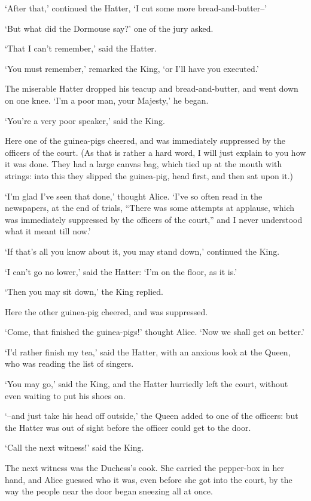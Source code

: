 \documentclass[statementpaper,twoside,openany]{memoir}
\begin{document}
`After that,' continued the Hatter, `I cut some more bread-and-butter--'

`But what did the Dormouse say?' one of the jury asked.

`That I can't remember,' said the Hatter.

`You must remember,' remarked the King, `or I'll have you executed.'

The miserable Hatter dropped his teacup and bread-and-butter, and went down on one knee. `I'm a poor man, your Majesty,' he began.

`You're a very poor speaker,' said the King.

Here one of the guinea-pigs cheered, and was immediately suppressed by the officers of the court. (As that is rather a hard word, I will just explain to you how it was done. They had a large canvas bag, which tied up at the mouth with strings: into this they slipped the guinea-pig, head first, and then sat upon it.)

`I'm glad I've seen that done,' thought Alice. `I've so often read in the newspapers, at the end of trials, ``There was some attempts at applause, which was immediately suppressed by the officers of the court,'' and I never understood what it meant till now.'

`If that's all you know about it, you may stand down,' continued the King.

`I can't go no lower,' said the Hatter: `I'm on the floor, as it is.'

`Then you may sit down,' the King replied.

Here the other guinea-pig cheered, and was suppressed.

`Come, that finished the guinea-pigs!' thought Alice. `Now we shall get on better.'

`I'd rather finish my tea,' said the Hatter, with an anxious look at the Queen, who was reading the list of singers.

`You may go,' said the King, and the Hatter hurriedly left the court, without even waiting to put his shoes on.

`--and just take his head off outside,' the Queen added to one of the officers: but the Hatter was out of sight before the officer could get to the door.

`Call the next witness!' said the King.

The next witness was the Duchess's cook. She carried the pepper-box in her hand, and Alice guessed who it was, even before she got into the court, by the way the people near the door began sneezing all at once.
\end{document}
